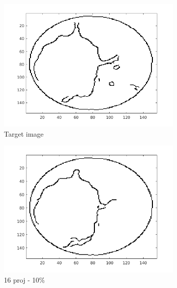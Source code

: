 \documentclass[10pt,a4paper,titlepage]{article}
\begin{document}
\begin{figure}[H]
        	
        	\begin{subfigure}[b]{0.32\textwidth}   
        	    \centering 
            	\includegraphics[width=\textwidth]{Sample1/Edges/target_0_10.png}
            	\caption{Target image}
        	\end{subfigure}
        	\begin{subfigure}[b]{0.32\textwidth}   
        	    \centering 
        	    \includegraphics[width=\textwidth]{Sample1/Edges/SB/p4_0_10.png}
        	    \caption{16 proj - 10\%}    
        	    \label{subfig:16p1L-D}
       		\end{subfigure}
        	\begin{subfigure}[b]{0.32\textwidth}  

\end{subfigure}
\end{figure}
\end{document}
